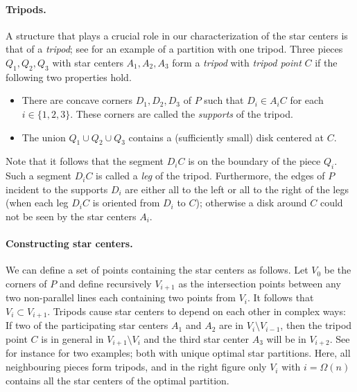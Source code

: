 \documentclass[10pt,a4paper]{article}
\begin{document}
\paragraph{Tripods.}
A structure that plays a crucial role in our characterization of the star centers is that of a \emph{tripod}; see  for an example of a partition with one tripod.
Three pieces $Q_1,Q_2,Q_3$ with star centers $A_1,A_2,A_3$ form a \emph{tripod} with \emph{tripod point} $C$ if the following two properties hold.
\begin{itemize}
\item
There are concave corners $D_1,D_2,D_3$ of $P$ such that $D_i\in A_iC$ for each $i\in\{1,2,3\}$.
These corners are called the \emph{supports} of the tripod.

\item
The union $Q_1\cup Q_2\cup Q_3$ contains a (sufficiently small) disk centered at $C$.
\end{itemize}
Note that it follows that the segment $D_iC$ is on the boundary of the piece $Q_i$.
Such a segment $D_iC$ is called a \emph{leg} of the tripod.
Furthermore, the edges of $P$ incident to the supports $D_i$ are either all to the left or all to the right of the legs (when each leg $D_iC$ is oriented from $D_i$ to $C$); otherwise a disk around $C$ could not be seen by the star centers $A_i$.

\paragraph{Constructing star centers.}
We can define a set of points containing the star centers as follows.
Let $V_0$ be the corners of $P$ and define recursively $V_{i+1}$ as the intersection points between any two non-parallel lines each containing two points from $V_i$.
It follows that $V_i\subset V_{i+1}$.
Tripods cause star centers to depend on each other in complex ways:
If two of the participating star centers $A_1$ and $A_2$ are in $V_i\setminus V_{i-1}$, then the tripod point $C$ is in general in $V_{i+1}\setminus V_i$ and the third star center $A_3$ will be in $V_{i+2}$.
See for instance  for two examples; both with unique optimal star partitions.
Here, all neighbouring pieces form tripods, and in the right figure only $V_i$ with $i=\Omega(n)$ contains all the star centers of the optimal partition.
\end{document}
